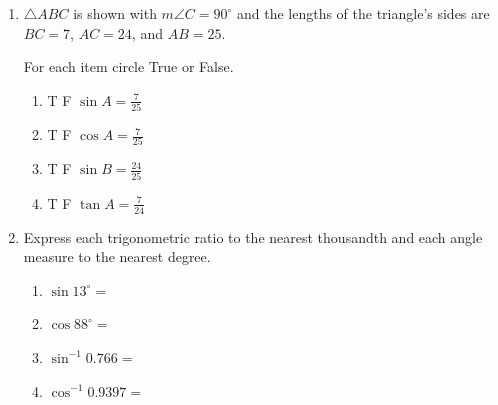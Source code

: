 \documentclass[12pt, twoside]{article}
\begin{document}
\begin{enumerate}
\newpage
  \item $\triangle ABC$ is shown with $m\angle C=90^\circ$ and the lengths of the triangle's sides are $BC=7$, $AC=24$, and $AB=25$.
     \begin{center}
      \end{center}
       For each item circle True or False.
       \begin{multicols}{2}
        \begin{enumerate}
        \item \quad T \qquad F \qquad $\displaystyle \sin A = \frac{7}{25}$ \vspace{0.25cm}
        \item \quad T \qquad F \qquad $\displaystyle \cos A = \frac{7}{25}$
        \item \quad T \qquad F \qquad $\displaystyle \sin B = \frac{24}{25}$ \vspace{0.25cm}
        \item \quad T \qquad F \qquad $\displaystyle \tan A = \frac{7}{24}$
      \end{enumerate}
    \end{multicols}
  \vspace{0.25cm}

  \item Express each trigonometric ratio to the nearest thousandth and each angle measure to the nearest degree.
    \begin{multicols}{2}
      \begin{enumerate}
        \item $\sin 13^\circ =$ \vspace{0.75cm}
        \item $\cos 88^\circ =$
        \item $\sin^{-1} 0.766 =$ \vspace{0.75cm}
        \item $\cos^{-1} 0.9397 =$
      \end{enumerate}
    \end{multicols} \vspace{0.25cm}


\end{enumerate}
\end{document}
